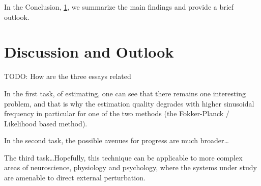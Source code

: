 \documentclass{report}
\begin{document}
In the Conclusion, \cref{ch:conclusion}, we summarize the main findings and
provide a brief outlook.

\cleardoublepage

\cleardoublepage

\cleardoublepage

\cleardoublepage

\cleardoublepage

\chapter{Discussion and Outlook}
\label{ch:conclusion}
TODO: How are the three essays related



In the first task, of estimating, one can see that there remains one interesting
problem, and that is why the estimation quality degrades with higher sinusoidal
frequency in particular for one of the two methods (the
Fokker-Planck / Likelihood based method).

In the second task, the possible avenues for progress are much broader\ldots 

The third task\ldots Hopefully, this technique can be applicable to more complex
areas of neuroscience, physiology and  psychology, where the systems under study
are amenable to direct external perturbation.



\cleardoublepage
% 


\end{document}
